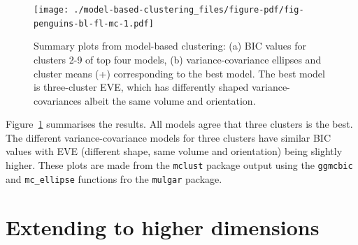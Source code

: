 \documentclass[
  letterpaper,
]{book}
\newenvironment{Shaded}{\begin{snugshade}}{\end{snugshade}}
\newcommand{\AttributeTok}[1]{\textcolor[rgb]{0.40,0.45,0.13}{#1}}
\newcommand{\DecValTok}[1]{\textcolor[rgb]{0.68,0.00,0.00}{#1}}
\newcommand{\FunctionTok}[1]{\textcolor[rgb]{0.28,0.35,0.67}{#1}}
\newcommand{\NormalTok}[1]{\textcolor[rgb]{0.00,0.23,0.31}{#1}}
\newcommand{\SpecialCharTok}[1]{\textcolor[rgb]{0.37,0.37,0.37}{#1}}
\newcommand{\StringTok}[1]{\textcolor[rgb]{0.13,0.47,0.30}{#1}}
\begin{document}
\begin{Shaded}
\end{Shaded}

\begin{figure}[H]

{\centering \texttt{[image: ./model-based-clustering\_files/figure-pdf/fig-penguins-bl-fl-mc-1.pdf]}

}

\caption{\label{fig-penguins-bl-fl-mc}Summary plots from model-based
clustering: (a) BIC values for clusters 2-9 of top four models, (b)
variance-covariance ellipses and cluster means (+) corresponding to the
best model. The best model is three-cluster EVE, which has differently
shaped variance-covariances albeit the same volume and orientation.}

\end{figure}

Figure~\ref{fig-penguins-bl-fl-mc} summarises the results. All models
agree that three clusters is the best. The different variance-covariance
models for three clusters have similar BIC values with EVE (different
shape, same volume and orientation) being slightly higher. These plots
are made from the \texttt{mclust} package output using the
\texttt{ggmcbic} and \texttt{mc\_ellipse} functions fro the
\texttt{mulgar} package.

\hypertarget{extending-to-higher-dimensions}{%
\section{Extending to higher
dimensions}\label{extending-to-higher-dimensions}}
\end{document}
